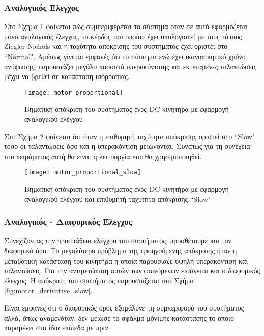 \subsubsection{Αναλογικός Έλεγχος}

Στο Σχήμα \ref{fig:motor_proportional} φαίνεται πώς συμπεριφέρεται το σύστημα όταν σε αυτό εφαρμόζεται μόνο αναλογικός έλεγχος, το κέρδος του οποίου έχει υπολογιστεί με τους τύπους Ziegler-Nichols και η ταχύτητα απόκρισης του συστήματος έχει οριστεί στο ``Normal". Αμέσως γίνεται εμφανές ότι το σύστημα ενώ έχει ικανοποιητικό χρόνο ανύψωσης, παρουσιάζει μεγάλο ποσοστό υπερακόντισης και εκτεταμένες ταλαντώσεις μέχρι να βρεθεί σε κατάσταση ισορροπίας.

\begin{figure}[h]
  \centering
  \texttt{[image: motor\_proportional]}
  \caption{Βηματική απόκριση του συστήματος ενός DC κινητήρα με εφαρμογή αναλογικού ελέγχου}
  \label{fig:motor_proportional}
\end{figure}

Στο Σχήμα \ref{fig:motor_proportional_slow} φαίνεται ότι όταν η επιθυμητή ταχύτητα απόκρισης οριστεί στο ``Slow" τόσο οι ταλαντώσεις όσο και η υπερακόντιση μειώνονται. Συνεπώς για τη συνέχεια του πειράματος αυτή θα είναι η λειτουργία που θα χρησιμοποιηθεί.

\begin{figure}[h]
  \centering
  \texttt{[image: motor\_proportional\_slow]}
  \caption{Βηματική απόκριση του συστήματος ενός DC κινητήρα με εφαρμογή αναλογικού ελέγχου και επιθυμητή ταχύτητα απόκρισης ``Slow"}
  \label{fig:motor_proportional_slow}
\end{figure}

\subsubsection{Αναλογικός - Διαφορικός Έλεγχος}

Συνεχίζοντας την προσπάθεια ελέγχου του συστήματος, προσθέτουμε και τον διαφορικό όρο. Το μεγαλύτερο πρόβλημα της προηγούμενης απόκρισης ήταν η μεταβατική κατάσταση του κινητήρα η οποία παρουσίαζε υψηλή υπερακόντιση και ταλαντώσεις. Για την αντιμετώπιση αυτών των φαινόμενων εισάγεται και ο διαφορικός έλεγχος. Η απόκριση του συστήματος παρουσιάζεται στο Σχήμα \ref{fig:motor_derivative_slow}.

Είναι εμφανές ότι ο διαφορικός όρος εξομάλυνε τη συμπεριφορά του συστήματος αλλά, όπως αναμενόταν, δεν μείωσε το σφάλμα μόνιμης κατάστασης το οποίο παραμένει στα ίδια επίπεδα με πριν.

